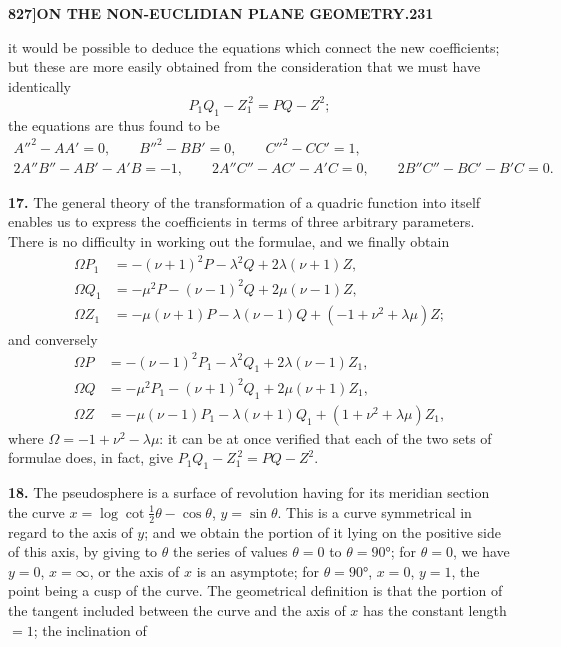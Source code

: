 \documentclass[12pt,a4paper]{article}
\theoremstyle{definition}
\begin{document}
\setcounter{page}{231}


\noindent\textbf{827]\quad ON THE NON-EUCLIDIAN PLANE GEOMETRY.}\hfill\textbf{231}

\bigskip

\noindent it would be possible to deduce the equations which connect the new coefficients; but these are more easily obtained from the consideration that we must have identically
\[
P_1 Q_1 - Z_1^{\,2} = PQ - Z^2;
\]
the equations are thus found to be
\begin{gather*}
A''^{2} - AA' = 0, \qquad B''^{2} - BB' = 0, \qquad C''^{2} - CC' = 1, \\
2A''B'' - AB' - A'B = -1, \qquad 2A''C'' - AC' - A'C = 0, \qquad 2B''C'' - BC' - B'C = 0.
\end{gather*}

\medskip

\noindent\textbf{17.} The general theory of the transformation of a quadric function into itself enables us to express the coefficients in terms of three arbitrary parameters. There is no difficulty in working out the formulae, and we finally obtain
\begin{align*}
\Omega P_1 &= -(\nu+1)^2 P - \lambda^2 Q + 2\lambda(\nu+1)Z, \\
\Omega Q_1 &= -\mu^2 P - (\nu-1)^2 Q + 2\mu(\nu-1)Z, \\
\Omega Z_1 &= -\mu(\nu+1)P - \lambda(\nu-1)Q + (-1 + \nu^2 + \lambda\mu)Z;
\end{align*}
and conversely
\begin{align*}
\Omega P &= -(\nu-1)^2 P_1 - \lambda^2 Q_1 + 2\lambda(\nu-1)Z_1, \\
\Omega Q &= -\mu^2 P_1 - (\nu+1)^2 Q_1 + 2\mu(\nu+1)Z_1, \\
\Omega Z &= -\mu(\nu-1)P_1 - \lambda(\nu+1)Q_1 + (1 + \nu^2 + \lambda\mu)Z_1,
\end{align*}
where $\Omega = -1 + \nu^2 - \lambda\mu$: it can be at once verified that each of the two sets of formulae does, in fact, give $P_1 Q_1 - Z_1^{\,2} = PQ - Z^2$.

\medskip

\noindent\textbf{18.} The pseudosphere is a surface of revolution having for its meridian section the curve $x = \log\cot\tfrac{1}{2}\theta - \cos\theta$, $y = \sin\theta$. This is a curve symmetrical in regard to the axis of $y$; and we obtain the portion of it lying on the positive side of this axis, by giving to $\theta$ the series of values $\theta = 0$ to $\theta = 90°$; for $\theta = 0$, we have $y = 0$, $x = \infty$, or the axis of $x$ is an asymptote; for $\theta = 90°$, $x = 0$, $y = 1$, the point being a cusp of the curve. The geometrical definition is that the portion of the tangent included between the curve and the axis of $x$ has the constant length $= 1$; the inclination of
\end{document}
